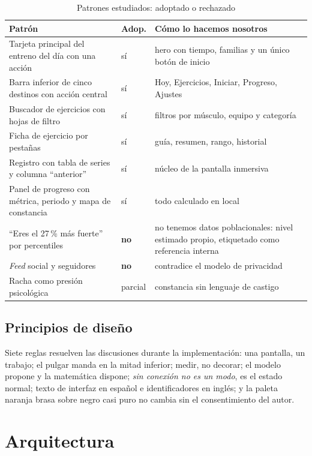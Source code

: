 \documentclass[conference]{IEEEtran}
\begin{document}
\begin{table}[t]
\caption{Patrones estudiados: adoptado o rechazado}
\label{tab:patterns}
\centering
\footnotesize
\begin{tabular}{@{}p{40mm}p{9mm}p{27mm}@{}}
\toprule
Patr\'on & Adop. & C\'omo lo hacemos nosotros \\
\midrule
Tarjeta principal del entreno del d\'ia con una acci\'on & s\'i & hero con tiempo, familias y un \'unico bot\'on de inicio \\
Barra inferior de cinco destinos con acci\'on central & s\'i & Hoy, Ejercicios, Iniciar, Progreso, Ajustes \\
Buscador de ejercicios con hojas de filtro & s\'i & filtros por m\'usculo, equipo y categor\'ia \\
Ficha de ejercicio por pesta\~nas & s\'i & gu\'ia, resumen, rango, historial \\
Registro con tabla de series y columna ``anterior'' & s\'i & n\'ucleo de la pantalla inmersiva \\
Panel de progreso con m\'etrica, periodo y mapa de constancia & s\'i & todo calculado en local \\
``Eres el 27\,\% m\'as fuerte'' por percentiles & \textbf{no} & no tenemos datos poblacionales: nivel estimado propio, etiquetado como referencia interna \\
\emph{Feed} social y seguidores & \textbf{no} & contradice el modelo de privacidad \\
Racha como presi\'on psicol\'ogica & parcial & constancia sin lenguaje de castigo \\
\bottomrule
\end{tabular}
\end{table}

\subsection{Principios de dise\~no}
Siete reglas resuelven las discusiones durante la implementaci\'on: una pantalla,
un trabajo; el pulgar manda en la mitad inferior; medir, no decorar; el modelo
propone y la matem\'atica dispone; \emph{sin conexi\'on no es un modo}, es el
estado normal; texto de interfaz en espa\~nol e identificadores en ingl\'es; y
la paleta naranja brasa sobre negro casi puro no cambia sin el consentimiento del
autor.

\section{Arquitectura}
\end{document}

